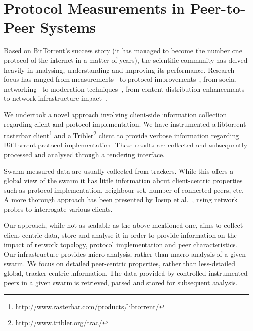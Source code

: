 
\chapter{Protocol Measurements in Peer-to-Peer Systems}
\label{chapter:proto-measure}

Based on BitTorrent's success story (it has managed to become the number one
protocol of the internet in a matter of years), the scientific community has
delved heavily in analysing, understanding and improving its performance.
Research focus has ranged from measurements~\cite{measurement-study} to
protocol improvements~\cite{bt-impr}, from social
networking~\cite{tribler-social} to moderation
techniques~\cite{measurements-analysis}, from content distribution
enhancements~\cite{bitos} to network infrastructure impact~\cite{bt-impact}.

We undertook a novel approach involving client-side information collection
regarding client and protocol implementation. We have instrumented a
libtorrent-rasterbar
client\footnote{http://www.rasterbar.com/products/libtorrent/} and a
Tribler\footnote{http://www.tribler.org/trac/} client to provide verbose
information regarding BitTorrent protocol implementation. These results are
collected and subsequently processed and analysed through a rendering
interface.


Swarm measured data are usually collected from trackers. While this offers a
global view of the swarm it has little information about client-centric
properties such as protocol implementation, neighbour set, number of connected
peers, etc. A more thorough approach has been presented by Iosup et
al.~\cite{corr-overlay}, using network probes to interrogate various clients.

Our approach, while not as scalable as the above mentioned one, aims to collect
client-centric data, store and analyse it in order to provide information on
the impact of network topology, protocol implementation and peer
characteristics. Our infrastructure provides micro-analysis, rather than
macro-analysis of a given swarm. We focus on detailed peer-centric properties,
rather than less-detailed global, tracker-centric information. The data
provided by controlled instrumented peers in a given swarm is retrieved,
parsed and stored for subsequent analysis.

